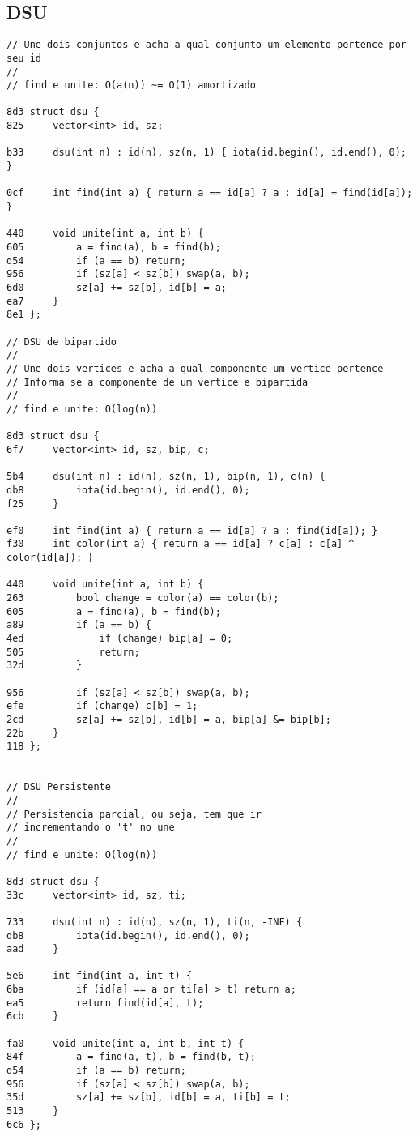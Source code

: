\documentclass[11pt, a4paper, twoside]{article}
\begin{document}
\subsection{DSU}
\begin{lstlisting}
// Une dois conjuntos e acha a qual conjunto um elemento pertence por seu id
//
// find e unite: O(a(n)) ~= O(1) amortizado

8d3 struct dsu {
825 	vector<int> id, sz;
    
b33 	dsu(int n) : id(n), sz(n, 1) { iota(id.begin(), id.end(), 0); }
    
0cf 	int find(int a) { return a == id[a] ? a : id[a] = find(id[a]); }
    
440 	void unite(int a, int b) {
605 		a = find(a), b = find(b);
d54 		if (a == b) return;
956 		if (sz[a] < sz[b]) swap(a, b);
6d0 		sz[a] += sz[b], id[b] = a;
ea7 	}
8e1 };

// DSU de bipartido
//
// Une dois vertices e acha a qual componente um vertice pertence
// Informa se a componente de um vertice e bipartida
//
// find e unite: O(log(n))

8d3 struct dsu {
6f7 	vector<int> id, sz, bip, c;
    
5b4 	dsu(int n) : id(n), sz(n, 1), bip(n, 1), c(n) { 
db8 		iota(id.begin(), id.end(), 0); 
f25 	}
    
ef0 	int find(int a) { return a == id[a] ? a : find(id[a]); }
f30 	int color(int a) { return a == id[a] ? c[a] : c[a] ^ color(id[a]); }
    
440 	void unite(int a, int b) {
263 		bool change = color(a) == color(b);
605 		a = find(a), b = find(b);
a89 		if (a == b) {
4ed 			if (change) bip[a] = 0;
505 			return;
32d 		}
    		
956 		if (sz[a] < sz[b]) swap(a, b);
efe 		if (change) c[b] = 1;
2cd 		sz[a] += sz[b], id[b] = a, bip[a] &= bip[b];
22b 	}
118 };


// DSU Persistente
//
// Persistencia parcial, ou seja, tem que ir
// incrementando o 't' no une
//
// find e unite: O(log(n))

8d3 struct dsu {
33c 	vector<int> id, sz, ti;
    
733 	dsu(int n) : id(n), sz(n, 1), ti(n, -INF) { 
db8 		iota(id.begin(), id.end(), 0); 
aad 	}
    
5e6 	int find(int a, int t) { 
6ba 		if (id[a] == a or ti[a] > t) return a;
ea5 		return find(id[a], t);
6cb 	}
    
fa0 	void unite(int a, int b, int t) {
84f 		a = find(a, t), b = find(b, t);
d54 		if (a == b) return;
956 		if (sz[a] < sz[b]) swap(a, b);
35d 		sz[a] += sz[b], id[b] = a, ti[b] = t;
513 	}
6c6 };


\end{lstlisting}
\end{document}
